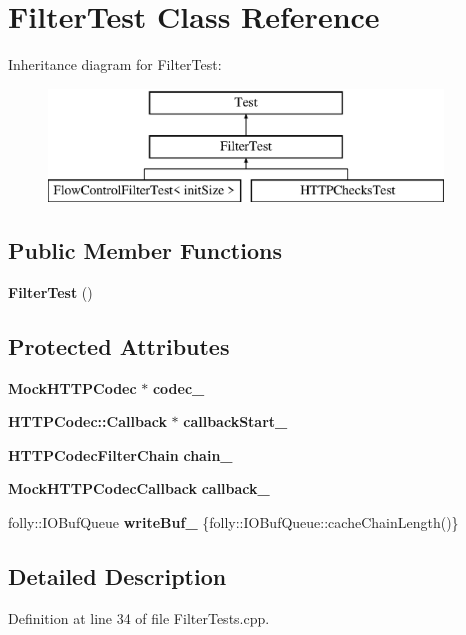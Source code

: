 \section{Filter\+Test Class Reference}
\label{classFilterTest}
Inheritance diagram for Filter\+Test\+:\begin{figure}[H]
\begin{center}
\leavevmode
\includegraphics[height=3.000000cm]{classFilterTest}
\end{center}
\end{figure}
\subsection*{Public Member Functions}
\begin{DoxyCompactItemize}
\item 
{\bf Filter\+Test} ()
\end{DoxyCompactItemize}
\subsection*{Protected Attributes}
\begin{DoxyCompactItemize}
\item 
{\bf Mock\+H\+T\+T\+P\+Codec} $\ast$ {\bf codec\+\_\+}
\item 
{\bf H\+T\+T\+P\+Codec\+::\+Callback} $\ast$ {\bf callback\+Start\+\_\+}
\item 
{\bf H\+T\+T\+P\+Codec\+Filter\+Chain} {\bf chain\+\_\+}
\item 
{\bf Mock\+H\+T\+T\+P\+Codec\+Callback} {\bf callback\+\_\+}
\item 
folly\+::\+I\+O\+Buf\+Queue {\bf write\+Buf\+\_\+} \{folly\+::\+I\+O\+Buf\+Queue\+::cache\+Chain\+Length()\}
\end{DoxyCompactItemize}


\subsection{Detailed Description}


Definition at line 34 of file Filter\+Tests.\+cpp.



